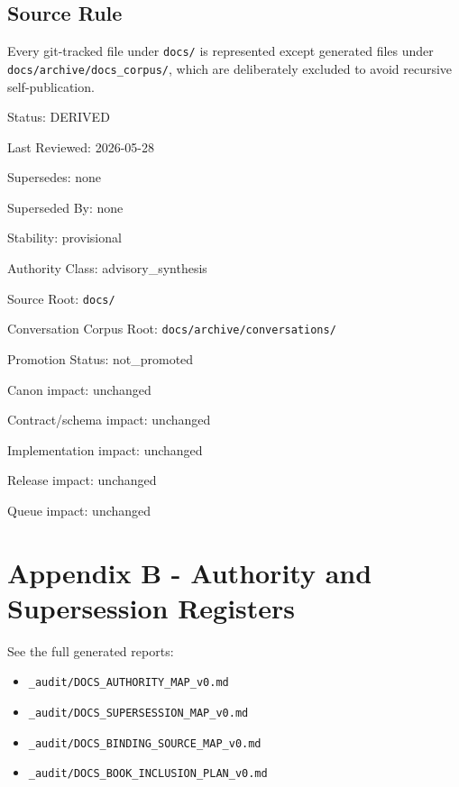 \documentclass[9pt,a4paper]{book}
\begin{document}
\chapter{Source Rule}

Every git-\allowbreak{}tracked file under \texttt{docs/\allowbreak{}} is represented except generated files under \texttt{docs/\allowbreak{}archive/\allowbreak{}docs\_\allowbreak{}corpus/\allowbreak{}}, which are deliberately excluded to avoid recursive self-\allowbreak{}publication.\allowbreak{}



Status: DERIVED

Last Reviewed: 2026-\allowbreak{}05-\allowbreak{}28

Supersedes: none

Superseded By: none

Stability: provisional

Authority Class: advisory\_\allowbreak{}synthesis

Source Root: \texttt{docs/\allowbreak{}}

Conversation Corpus Root: \texttt{docs/\allowbreak{}archive/\allowbreak{}conversations/\allowbreak{}}

Promotion Status: not\_\allowbreak{}promoted

Canon impact: unchanged

Contract/\allowbreak{}schema impact: unchanged

Implementation impact: unchanged

Release impact: unchanged

Queue impact: unchanged


\part{Appendix B -\allowbreak{} Authority and Supersession Registers}

See the full generated reports:


\begin{itemize}
\item \texttt{\_\allowbreak{}audit/\allowbreak{}DOCS\_\allowbreak{}AUTHORITY\_\allowbreak{}MAP\_\allowbreak{}v0.\allowbreak{}md}
\item \texttt{\_\allowbreak{}audit/\allowbreak{}DOCS\_\allowbreak{}SUPERSESSION\_\allowbreak{}MAP\_\allowbreak{}v0.\allowbreak{}md}
\item \texttt{\_\allowbreak{}audit/\allowbreak{}DOCS\_\allowbreak{}BINDING\_\allowbreak{}SOURCE\_\allowbreak{}MAP\_\allowbreak{}v0.\allowbreak{}md}
\item \texttt{\_\allowbreak{}audit/\allowbreak{}DOCS\_\allowbreak{}BOOK\_\allowbreak{}INCLUSION\_\allowbreak{}PLAN\_\allowbreak{}v0.\allowbreak{}md}
\end{itemize}
\end{document}

